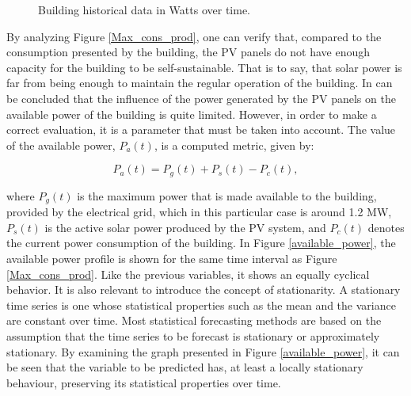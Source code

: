 \begin{figure}[h!]
    \captionsetup[subfigure]{position=b}
    \centering
    \label{fig:ap}
    \caption{Building historical data in Watts over time.}
\end{figure}


By analyzing Figure \ref{Max_cons_prod}, one can verify that, compared to the consumption presented by the building, the \ac{PV} panels do not have enough capacity for the building to be self-sustainable. That is to say, that solar power is far from being enough to maintain the regular operation of the building. In can be concluded that the influence of the power generated by the \ac{PV} panels on the available power of the building is quite limited. However, in order to make a correct evaluation, it is a parameter that must be taken into account. The value of the available power, $P_a(t)$, is a computed metric, given by:

\begin{equation}
   P_a(t) = P_g(t) + P_s(t) - P_c(t),
   \label{available}
\end{equation}

where $P_g(t)$ is the maximum power that is made available to the building, provided by the electrical grid, which in this particular case is around 1.2 MW, $P_s(t)$ is the active solar power produced by the \ac{PV} system, and $P_c(t)$ denotes the current power consumption of the building. In Figure \ref{available_power}, the available power profile is shown for the same time interval as Figure \ref{Max_cons_prod}. Like the previous variables, it shows an equally cyclical behavior. It is also relevant to introduce the concept of stationarity. A stationary time series is one whose statistical properties such as the mean and the variance are constant over time. Most statistical forecasting methods are based on the assumption that the time series to be forecast is stationary or approximately stationary. By examining the graph presented in Figure \ref{available_power}, it can be seen that the variable to be predicted has, at least a locally stationary behaviour, preserving its statistical properties over time.

